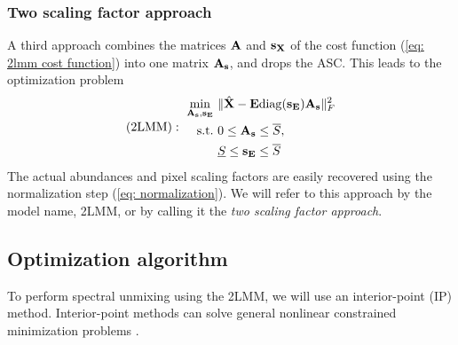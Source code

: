 \subsubsection{Two scaling factor approach}
A third approach combines the matrices $\mathbf{A}$ and $\mathbf{s}_{\mathbf{X}}$ of the cost function (\ref{eq: 2lmm cost function}) into one matrix $\mathbf{A}_{\mathbf{s}}$, and drops the ASC. This leads to the optimization problem
\begin{equation} \label{eq: two scaling factor}
  (\mathrm{2LMM}):~ \begin{aligned}
        \min_{\mathbf{A}_{\mathbf{s}}, \mathbf{s}_{\mathbf{E}}} &~\|\Hat{\mathbf{X}} - \mathbf{E} \mathrm{diag}(\mathbf{s}_{\mathbf{E}})\mathbf{A}_{\mathbf{s}}\|_F^2 \\
    \text{s.t.} &~ 0 \leq \mathbf{A}_{\mathbf{s}} \leq \overline{S},  \\
    &~ \underline{S} \leq \mathbf{s}_{\mathbf{E}} \leq \overline{S}
\end{aligned}
\end{equation}
The actual abundances and pixel scaling factors are easily recovered using the normalization step (\ref{eq: normalization}). We will refer to this approach by the model name, 2LMM, or by calling it the \emph{two scaling factor approach}.

\subsection{Optimization algorithm}
To perform spectral unmixing using the 2LMM, we will use an interior-point (IP) method. Interior-point methods can solve general nonlinear constrained minimization problems \cite{geletu_introduction_nodate}. 

